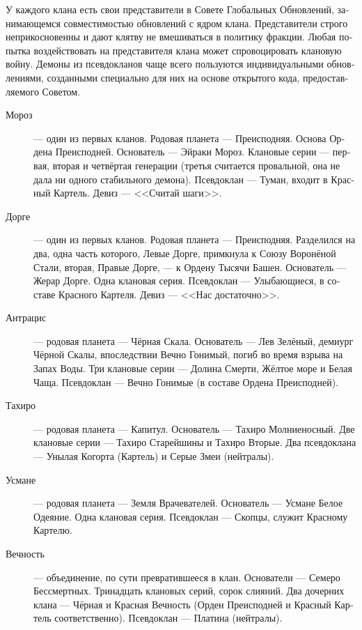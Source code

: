 \documentclass[a4paper,12pt,fleqn]{book}\usepackage{polyglossia}\setdefaultlanguage[babelshorthands=true]{russian}\setotherlanguage{english}\defaultfontfeatures{Ligatures=TeX,Mapping=tex-text}\usepackage{xcolor}\newcommand{\ml}[3]{#2}
\begin{document}
{У каждого клана есть свои представители в Совете Глобальных Обновлений, занимающемся совместимостью обновлений с ядром клана.
Представители строго неприкосновенны и дают клятву не вмешиваться в политику фракции.
Любая попытка воздействовать на представителя клана может спровоцировать клановую войну.
Демоны из псевдокланов чаще всего пользуются индивидуальными обновлениями, созданными специально для них на основе открытого кода, предоставляемого Советом.

\begin{description}

\item[Мороз] --- один из первых кланов.
Родовая планета --- Преисподняя.
Основа Ордена Преисподней.
Основатель --- Эйраки Мороз.
Клановые серии --- первая, вторая и четвёртая генерации (третья считается провальной, она не дала ни одного стабильного демона).
Псевдоклан --- Туман, входит в Красный Картель.
Девиз --- <<Считай шаги>>.

\item[Дорге] --- один из первых кланов.
Родовая планета --- Преисподняя.
Разделился на два, одна часть которого, Левые Дорге, примкнула к Союзу Воронёной Стали, вторая, Правые Дорге, --- к Ордену Тысячи Башен.
Основатель --- Жерар Дорге.
Одна клановая серия.
Псевдоклан --- Улыбающиеся, в составе Красного Картеля.
Девиз --- <<Нас достаточно>>.

\item[Антрацис] --- родовая планета --- Чёрная Скала.
Основатель --- Лев Зелёный, демиург Чёрной Скалы, впоследствии Вечно Гонимый, погиб во время взрыва на Запах Воды.
Три клановые серии --- Долина Смерти, Жёлтое море и Белая Чаща.
Псевдоклан --- Вечно Гонимые (в составе Ордена Преисподней).

\item[Тахиро] --- родовая планета --- Капитул.
Основатель --- Тахиро Молниеносный.
Две клановые серии --- Тахиро Старейшины и Тахиро Вторые.
Два псевдоклана --- Унылая Когорта (Картель) и Серые Змеи (нейтралы).

\item[Усмане] --- родовая планета --- Земля Врачевателей.
Основатель --- Усмане Белое Одеяние.
Одна клановая серия.
Псевдоклан --- Скопцы, служит Красному Картелю.

\item[Вечность] --- объединение, по сути превратившееся в клан.
Основатели --- Семеро Бессмертных.
Тринадцать клановых серий, сорок слияний.
Два дочерних клана --- Чёрная и Красная Вечность (Орден Преисподней и Красный Картель соответственно).
Псевдоклан --- Платина (нейтралы).


\end{description}}
\end{document}
